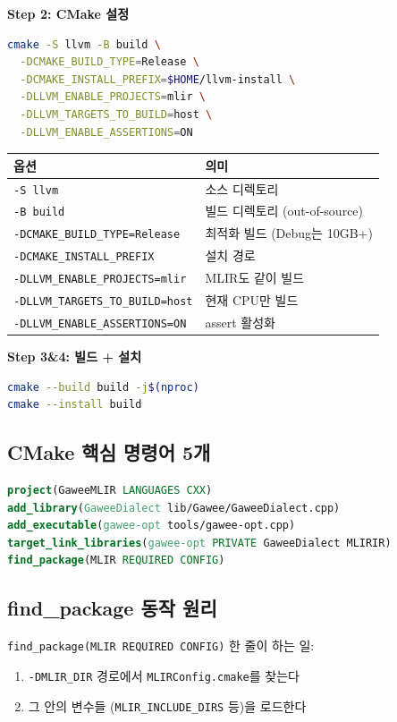 \documentclass[11pt,a4paper]{article}
\begin{document}
\textbf{Step 2: CMake 설정}
\begin{lstlisting}[language=bash]
cmake -S llvm -B build \
  -DCMAKE_BUILD_TYPE=Release \
  -DCMAKE_INSTALL_PREFIX=$HOME/llvm-install \
  -DLLVM_ENABLE_PROJECTS=mlir \
  -DLLVM_TARGETS_TO_BUILD=host \
  -DLLVM_ENABLE_ASSERTIONS=ON
\end{lstlisting}

\begin{longtable}{p{5cm}p{9cm}}
\toprule
옵션 & 의미 \\
\midrule
\texttt{-S llvm} & 소스 디렉토리 \\
\texttt{-B build} & 빌드 디렉토리 (out-of-source) \\
\texttt{-DCMAKE\_BUILD\_TYPE=Release} & 최적화 빌드 (Debug는 10GB+) \\
\texttt{-DCMAKE\_INSTALL\_PREFIX} & 설치 경로 \\
\texttt{-DLLVM\_ENABLE\_PROJECTS=mlir} & MLIR도 같이 빌드 \\
\texttt{-DLLVM\_TARGETS\_TO\_BUILD=host} & 현재 CPU만 빌드 \\
\texttt{-DLLVM\_ENABLE\_ASSERTIONS=ON} & assert 활성화 \\
\bottomrule
\end{longtable}

\textbf{Step 3\&4: 빌드 + 설치}
\begin{lstlisting}[language=bash]
cmake --build build -j$(nproc)
cmake --install build
\end{lstlisting}

\subsection{CMake 핵심 명령어 5개}
\begin{lstlisting}[language=cmake]
project(GaweeMLIR LANGUAGES CXX)
add_library(GaweeDialect lib/Gawee/GaweeDialect.cpp)
add_executable(gawee-opt tools/gawee-opt.cpp)
target_link_libraries(gawee-opt PRIVATE GaweeDialect MLIRIR)
find_package(MLIR REQUIRED CONFIG)
\end{lstlisting}

\subsection{find\_package 동작 원리}
\texttt{find\_package(MLIR REQUIRED CONFIG)} 한 줄이 하는 일:
\begin{enumerate}[nosep]
\item \texttt{-DMLIR\_DIR} 경로에서 \texttt{MLIRConfig.cmake}를 찾는다
\item 그 안의 변수들 (\texttt{MLIR\_INCLUDE\_DIRS} 등)을 로드한다
\end{enumerate}
\end{document}

